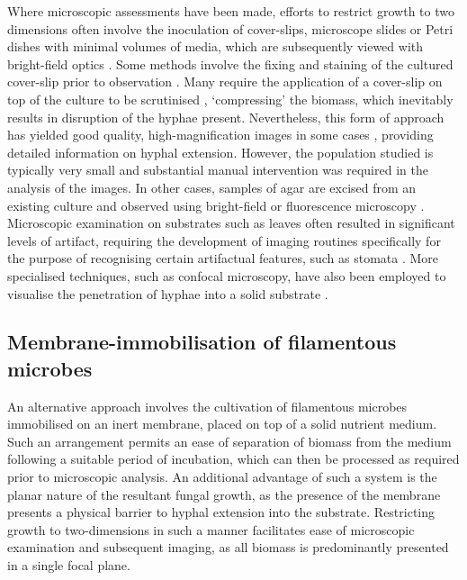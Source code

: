 Where microscopic assessments have been made, efforts to restrict growth to two dimensions often involve the inoculation of cover-slips, microscope slides or Petri dishes with minimal volumes of media, which are subsequently viewed with bright-field optics \cite{obert1990,sautour2001,tebiesebeke2005,rahardjo2005b,kubo2007}. Some methods involve the fixing and staining of the cultured cover-slip prior to observation \cite{lin2004}. Many require the application of a cover-slip on top of the culture to be scrutinised \cite{lin2004,bartnicki-garcia2000,dieguez-uribeondo2005}, \lq compressing' the biomass, which inevitably results in disruption of the hyphae present. Nevertheless, this form of approach has yielded good quality, high-magnification images in some cases \cite{bartnicki-garcia2000,dieguez-uribeondo2005}, providing detailed information on hyphal extension. However, the population studied is typically very small and substantial manual intervention was required in the analysis of the images. In other cases, samples of agar are excised from an existing culture and observed using bright-field or fluorescence microscopy \cite{medwid1984,nonomura2003,pardo2005}. Microscopic examination on substrates such as leaves often resulted in significant levels of artifact, requiring the development of imaging routines specifically for the purpose of recognising certain artifactual features, such as stomata \cite{daniel1995}. More specialised techniques, such as confocal microscopy, have also been employed to visualise the penetration of hyphae into a solid substrate \cite{nopharatana2003}.

\subsection{Membrane-immobilisation of filamentous microbes}

An alternative approach involves the cultivation of filamentous microbes immobilised on an inert membrane, placed on top of a solid nutrient medium. Such an arrangement permits an ease of separation of biomass from the medium following a suitable period of incubation, which can then be processed as required prior to microscopic analysis. An additional advantage of such a system is the planar nature of the resultant fungal growth, as the presence of the membrane presents a physical barrier to hyphal extension into the substrate. Restricting growth to two-dimensions in such a manner facilitates ease of microscopic examination and subsequent imaging, as all biomass is predominantly presented in a single focal plane.

